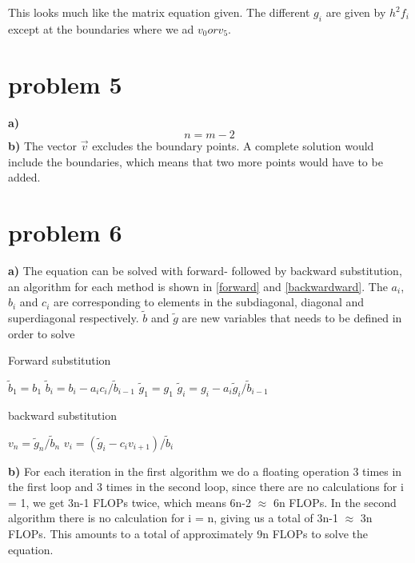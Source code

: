 \documentclass[english,notitlepage]{revtex4-1}
\begin{document}
	This looks much like the matrix equation given. The different $g_i$ are given by $h^2f_i$ except at the boundaries where we ad $v_0 or v_5$. 
	
	\section*{problem 5}
	\textbf{a)} 
	$$n = m-2$$
	\textbf{b)} 
	The vector $\overrightarrow{v}$ excludes the boundary points. A complete solution would include the boundaries, which means that two more points would have to be added.
	
	\section*{problem 6}
	\textbf{a)}
	The equation can be solved with forward- followed by backward substitution, an algorithm for each method is shown in \ref{forward} and \ref{backwardward}. The $a_i$, $b_i$ and $c_i$ are corresponding to elements in the subdiagonal, diagonal and superdiagonal respectively. $\tilde{b}$ and $\tilde{g}$ are new variables that needs to be defined in order to solve
	\begin{algorithm}[H]
		\caption{Forward substitution}\label{forward}
		\begin{algorithmic}
			\State $\tilde{b}_1 = b_1$
			\State $\tilde{b}_i = b_i - a_ic_i/\tilde{b}_{i-1}$
			\EndFor
			\State $\tilde{g}_1 = g_1$
			\State $\tilde{g}_i = g_i - a_i\tilde{g}_i/\tilde{b}_{i-1}$
			\EndFor
		\end{algorithmic}
	\end{algorithm}

	\begin{algorithm}[H]
		\caption{backward substitution}\label{backwardward}
		\begin{algorithmic}
			\State $v_n = \tilde{g}_n/\tilde{b}_n$
			\For{$i = n-1, n-2, ..., 1$}
			\State $v_i = (\tilde{g}_i - c_iv_{i+1})/\tilde{b}_{i}$
			\EndFor	
		\end{algorithmic}
	\end{algorithm}	

	\textbf{b)} For each iteration in the first algorithm we do a floating operation 3 times in the first loop and 3 times in the second loop, since there are no calculations for i = 1, we get 3n-1 FLOPs twice, which means 6n-2 $\approx$ 6n FLOPs. In the second algorithm there is no calculation for i = n, giving us a total of 3n-1 $\approx$ 3n FLOPs. This amounts to a total of approximately 9n FLOPs to solve the equation.
	
\end{document}
